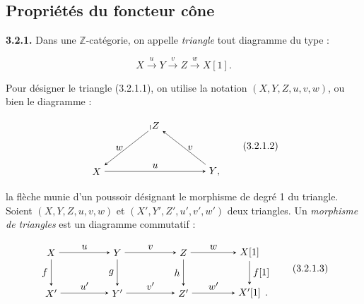 \clearpage
{}%
\subsection{Propriétés du foncteur cône}

\noindent\textbf{3.2.1.}\quad
{}
Dans une $\mathbb Z$-catégorie, on appelle \emph{triangle} tout diagramme du
type :

\begin{equation}
  X\xrightarrow{u}Y\xrightarrow{v}Z\xrightarrow{w}X[1].
  \tag{3.2.1.1}
\end{equation}

Pour désigner le triangle (3.2.1.1), on utilise la notation
$(X,Y,Z,u,v,w)$, ou bien le diagramme :

\begin{equation}
  \begin{tikzpicture}[>=stealth,baseline=(current bounding box.center)]
    \node (X) at (0,0) {$X$};
    \node (Y) at (4.2,0) {$Y\mathpunct{,}$};
    \node (Z) at (2.1,1.65) {$Z$};
    \draw[->] (X) -- node[above] {$u$} (Y);
    \draw[->] (Y) -- node[right] {$v$} (Z);
    \draw[->] (Z) -- node[left] {$w$} (X);
    \draw[line width=0.45pt] (1.91,1.50) -- (1.91,1.67);
  \end{tikzpicture}
  \tag{3.2.1.2}
\end{equation}

la flèche munie d'un poussoir désignant le morphisme de degré 1 du triangle.
Soient $(X,Y,Z,u,v,w)$ et $(X',Y',Z',u',v',w')$ deux triangles. Un
\emph{morphisme de triangles} est un diagramme commutatif :

\begin{equation}
  \begin{tikzpicture}[>=stealth,baseline=(current bounding box.center)]
    \node (X)  at (0,1.45) {$X$};
    \node (Y)  at (2.35,1.45) {$Y$};
    \node (Z)  at (4.70,1.45) {$Z$};
    \node (Xs) at (7.05,1.45) {$X[1]$};
    \node (Xp) at (0,0) {$X'$};
    \node (Yp) at (2.35,0) {$Y'$};
    \node (Zp) at (4.70,0) {$Z'$};
    \node (Xps) at (7.05,0) {$X'[1]$};
    \node[anchor=base west,inner sep=0pt,xshift=.08em] at (Xps.base east) {$.$};
    \draw[->] (X) -- node[above] {$u$} (Y);
    \draw[->] (Y) -- node[above] {$v$} (Z);
    \draw[->] (Z) -- node[above] {$w$} (Xs);
    \draw[->] (Xp) -- node[above] {$u'$} (Yp);
    \draw[->] (Yp) -- node[above] {$v'$} (Zp);
    \draw[->] (Zp) -- node[above] {$w'$} (Xps);
    \draw[->] (X) -- node[left] {$f$} (Xp);
    \draw[->] (Y) -- node[left] {$g$} (Yp);
    \draw[->] (Z) -- node[left] {$h$} (Zp);
    \draw[->] (Xs) -- node[right] {$f[1]$} (Xps);
  \end{tikzpicture}
  \tag{3.2.1.3}
\end{equation}

